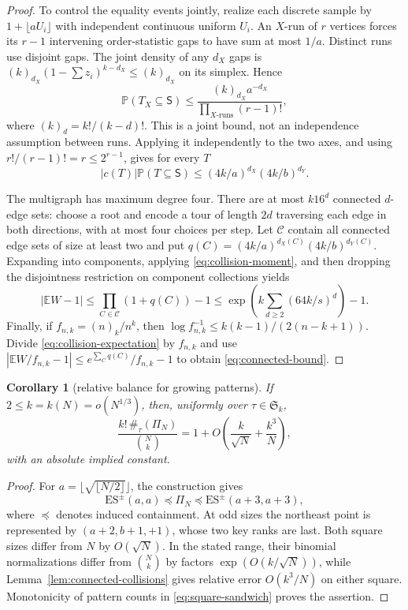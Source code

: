 \documentclass[11pt,letterpaper]{article}
\newtheorem{corollary}[theorem]{Corollary}
\newcommand{\Ssym}{\mathfrak S}
\begin{document}
\begin{proof}
To control the equality events jointly, realize each discrete sample by
$1+\lfloor aU_i\rfloor$ with independent continuous uniform $U_i$.
An $X$-run of $r$ vertices forces its $r-1$ intervening order-statistic
gaps to have sum at most $1/a$. Distinct runs use disjoint gaps. The joint
density of any $d_X$ gaps is
$(k)_{d_X}(1-\sum z_i)^{k-d_X}\le(k)_{d_X}$ on its simplex. Hence
\[
 \mathbb P(T_X\subseteq\mathsf S)
 \le\frac{(k)_{d_X}a^{-d_X}}{\prod_{X\text{-runs}}(r-1)!},
\]
where $(k)_d=k!/(k-d)!$. This is a joint bound, not an independence
assumption between runs. Applying it independently to the two axes, and
using $r!/(r-1)!=r\le2^{r-1}$, gives for every $T$
\begin{equation}\label{eq:collision-moment}
 |c(T)|\mathbb P(T\subseteq\mathsf S)
 \le(4k/a)^{d_X}(4k/b)^{d_Y}.
\end{equation}

The multigraph has maximum degree four. There are at most $k16^d$ connected
$d$-edge sets: choose a root and encode a tour of length $2d$ traversing
each edge in both directions, with at most four choices per step. Let
$\mathcal C$ contain all connected edge sets of size at least two and put
$q(C)=(4k/a)^{d_X(C)}(4k/b)^{d_Y(C)}$. Expanding into components, applying
\eqref{eq:collision-moment}, and then dropping the disjointness restriction
on component collections yields
\[
 |\mathbb EW-1|\le\prod_{C\in\mathcal C}(1+q(C))-1
 \le\exp\left(k\sum_{d\ge2}(64k/s)^d\right)-1.
\]
Finally, if $f_{n,k}=(n)_k/n^k$, then
$\log f_{n,k}^{-1}\le k(k-1)/(2(n-k+1))$.
Divide \eqref{eq:collision-expectation} by $f_{n,k}$ and use
$|\mathbb EW/f_{n,k}-1|\le e^{\sum_Cq(C)}/f_{n,k}-1$ to obtain
\eqref{eq:connected-bound}.
\end{proof}

\begin{corollary}[relative balance for growing patterns]\label{cor:relative-grid}
If $2\le k=k(N)=o(N^{1/3})$, then, uniformly over $\tau\in\Ssym_k$,
\[
 \frac{k!\,\#_\tau(\Pi_N)}{\binom Nk}
 =1+O\left(\frac{k}{\sqrt N}+\frac{k^3}{N}\right),
\]
with an absolute implied constant.
\end{corollary}
\begin{proof}
For $a=\lfloor\sqrt{\lfloor N/2\rfloor}\rfloor$, the construction gives
\begin{equation}\label{eq:square-sandwich}
 \mathrm{ES}^{\pm}(a,a)\preceq\Pi_N
       \preceq\mathrm{ES}^{\pm}(a+3,a+3),
\end{equation}
where $\preceq$ denotes induced containment. At odd sizes the northeast
point is represented by $(a+2,b+1,+1)$, whose two key ranks are last.
Both square sizes differ from $N$ by $O(\sqrt N)$. In the stated range,
their binomial normalizations differ from $\binom Nk$ by factors
$\exp(O(k/\sqrt N))$, while Lemma~\ref{lem:connected-collisions} gives
relative error $O(k^3/N)$ on either square. Monotonicity of pattern counts
in \eqref{eq:square-sandwich} proves the assertion.
\end{proof}
\end{document}

